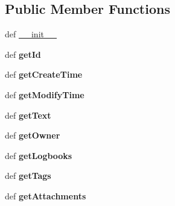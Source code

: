 \subsection*{Public Member Functions}
\begin{DoxyCompactItemize}
\item 
def \hyperlink{classpyOlog_1_1OlogDataTypes_1_1LogEntry_a13bf1f416e5bee9a944926e33b427fcd}{\-\_\-\-\_\-init\-\_\-\-\_\-}
\item 
\hypertarget{classpyOlog_1_1OlogDataTypes_1_1LogEntry_a672284e5f0662d1858aa5881ef47f8be}{def {\bfseries get\-Id}}\label{classpyOlog_1_1OlogDataTypes_1_1LogEntry_a672284e5f0662d1858aa5881ef47f8be}

\item 
\hypertarget{classpyOlog_1_1OlogDataTypes_1_1LogEntry_a59f60a7850fa72b5a70766573da665df}{def {\bfseries get\-Create\-Time}}\label{classpyOlog_1_1OlogDataTypes_1_1LogEntry_a59f60a7850fa72b5a70766573da665df}

\item 
\hypertarget{classpyOlog_1_1OlogDataTypes_1_1LogEntry_ac93331a643dec6d524ef8f39d5b57444}{def {\bfseries get\-Modify\-Time}}\label{classpyOlog_1_1OlogDataTypes_1_1LogEntry_ac93331a643dec6d524ef8f39d5b57444}

\item 
\hypertarget{classpyOlog_1_1OlogDataTypes_1_1LogEntry_a92d03e0011c826876e520fc8807a5b97}{def {\bfseries get\-Text}}\label{classpyOlog_1_1OlogDataTypes_1_1LogEntry_a92d03e0011c826876e520fc8807a5b97}

\item 
\hypertarget{classpyOlog_1_1OlogDataTypes_1_1LogEntry_a8a1353f4981b3cb1c448259d87a8be70}{def {\bfseries get\-Owner}}\label{classpyOlog_1_1OlogDataTypes_1_1LogEntry_a8a1353f4981b3cb1c448259d87a8be70}

\item 
\hypertarget{classpyOlog_1_1OlogDataTypes_1_1LogEntry_a936a44ddc8fae71244990b721798d833}{def {\bfseries get\-Logbooks}}\label{classpyOlog_1_1OlogDataTypes_1_1LogEntry_a936a44ddc8fae71244990b721798d833}

\item 
\hypertarget{classpyOlog_1_1OlogDataTypes_1_1LogEntry_a94d1b849d15282ccbb65650b0726440f}{def {\bfseries get\-Tags}}\label{classpyOlog_1_1OlogDataTypes_1_1LogEntry_a94d1b849d15282ccbb65650b0726440f}

\item 
\hypertarget{classpyOlog_1_1OlogDataTypes_1_1LogEntry_a9ec5d7b29198de3e784c9e4c8505483d}{def {\bfseries get\-Attachments}}\label{classpyOlog_1_1OlogDataTypes_1_1LogEntry_a9ec5d7b29198de3e784c9e4c8505483d}


\end{DoxyCompactItemize}
